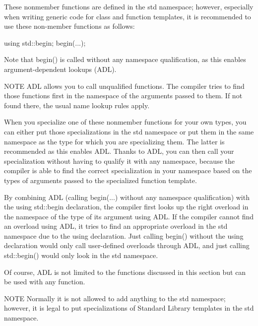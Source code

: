 These nonmember functions are defined in the std namespace; however, especially when writing generic code for class and function templates, it is recommended to use these non-member functions as follows:

\begin{cpp}
using std::begin;
begin(...);
\end{cpp}

Note that begin() is called without any namespace qualification, as this enables argument-dependent lookups (ADL).

\begin{myNotic}{NOTE}
ADL allows you to call unqualified functions. The compiler tries to find those functions first in the namespace of the arguments passed to them. If not found there, the usual name lookup rules apply.
\end{myNotic}

When you specialize one of these nonmember functions for your own types, you can either put those specializations in the std namespace or put them in the same namespace as the type for which you are specializing them. The latter is recommended as this enables ADL. Thanks to ADL, you can then call your specialization without having to qualify it with any namespace, because the compiler is able to find the correct specialization in your namespace based on the types of arguments passed to the specialized function template.

By combining ADL (calling begin(...) without any namespace qualification) with the using std::begin declaration, the compiler first looks up the right overload in the namespace of the type of its argument using ADL. If the compiler cannot find an overload using ADL, it tries to find an appropriate overload in the std namespace due to the using declaration. Just calling begin() without the using declaration would only call user-defined overloads through ADL, and just calling std::begin() would only look in the std namespace.

Of course, ADL is not limited to the functions discussed in this section but can be used with any function.

\begin{myNotic}{NOTE}
Normally it is not allowed to add anything to the std namespace; however, it is legal to put specializations of Standard Library templates in the std namespace.
\end{myNotic}


